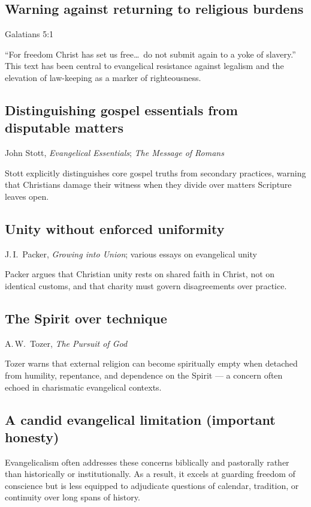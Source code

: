 \documentclass[10pt,twoside,openany]{book}
\begin{document}
\subsection{Warning against returning to religious burdens}
{\small Galatians 5:1}

``For freedom Christ has set us free\ldots\ do not submit again to a yoke of
slavery.'' This text has been central to evangelical resistance against
legalism and the elevation of law-keeping as a marker of righteousness.

\subsection{Distinguishing gospel essentials from disputable matters}
{\small John Stott, \emph{Evangelical Essentials}; \emph{The Message of Romans}}

Stott explicitly distinguishes core gospel truths from secondary
practices, warning that Christians damage their witness when they
divide over matters Scripture leaves open.

\subsection{Unity without enforced uniformity}
{\small J.\,I.\ Packer, \emph{Growing into Union}; various essays on evangelical unity}

Packer argues that Christian unity rests on shared faith in Christ, not
on identical customs, and that charity must govern disagreements over
practice.

\subsection{The Spirit over technique}
{\small A.\,W.\ Tozer, \emph{The Pursuit of God}}

Tozer warns that external religion can become spiritually empty when
detached from humility, repentance, and dependence on the Spirit --- a
concern often echoed in charismatic evangelical contexts.

\subsection{A candid evangelical limitation (important honesty)}

Evangelicalism often addresses these concerns biblically and pastorally
rather than historically or institutionally. As a result, it excels at
guarding freedom of conscience but is less equipped to adjudicate
questions of calendar, tradition, or continuity over long spans of
history.
\end{document}
